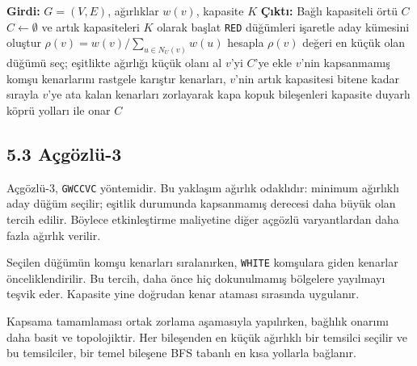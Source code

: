 \documentclass[11pt]{article}
\begin{document}
\begin{algorithm}[h]
\caption{Açgözlü-2 / GRCCVC}
\begin{algorithmic}[1]
\State \textbf{Girdi:} \(G=(V,E)\), ağırlıklar \(w(v)\), kapasite \(K\)
\State \textbf{Çıktı:} Bağlı kapasiteli örtü \(C\)
\State \(C\gets\emptyset\) ve artık kapasiteleri \(K\) olarak başlat
    \State \texttt{RED} düğümleri işaretle
    \State aday kümesini oluştur
        \State \(\rho(v)=w(v)/\sum_{u\in N_U(v)}w(u)\) hesapla
    \EndFor
    \State \(\rho(v)\) değeri en küçük olan düğümü seç; eşitlikte ağırlığı küçük olanı al
    \State \(v\)'yi \(C\)'ye ekle
    \State \(v\)'nin kapsanmamış komşu kenarlarını rastgele karıştır
    \State kenarları, \(v\)'nin artık kapasitesi bitene kadar sırayla \(v\)'ye ata
\EndWhile
{}
    \State kalan kenarları zorlayarak kapa
\EndIf
\State kopuk bileşenleri kapasite duyarlı köprü yolları ile onar
\State \Return \(C\)
\end{algorithmic}
\end{algorithm}

\subsection*{5.3 Açgözlü-3}

Açgözlü-3, \texttt{GWCCVC} yöntemidir. Bu yaklaşım ağırlık odaklıdır: minimum ağırlıklı aday düğüm seçilir; eşitlik durumunda kapsanmamış derecesi daha büyük olan tercih edilir. Böylece etkinleştirme maliyetine diğer açgözlü varyantlardan daha fazla ağırlık verilir.

Seçilen düğümün komşu kenarları sıralanırken, \texttt{WHITE} komşulara giden kenarlar önceliklendirilir. Bu tercih, daha önce hiç dokunulmamış bölgelere yayılmayı teşvik eder. Kapasite yine doğrudan kenar ataması sırasında uygulanır.

Kapsama tamamlaması ortak zorlama aşamasıyla yapılırken, bağlılık onarımı daha basit ve topolojiktir. Her bileşenden en küçük ağırlıklı bir temsilci seçilir ve bu temsilciler, bir temel bileşene BFS tabanlı en kısa yollarla bağlanır.
\end{document}
